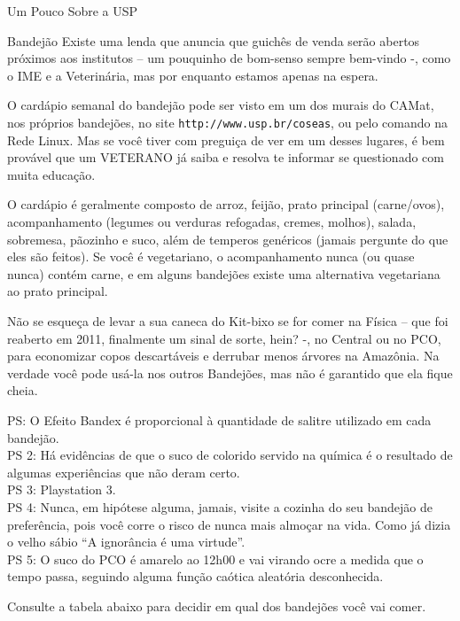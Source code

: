 \begin{secao}{Um Pouco Sobre a USP}
\begin{subsecao}{Bandejão}
Existe uma lenda que anuncia que guichês de venda serão abertos próximos aos
institutos – um pouquinho de bom-senso sempre bem-vindo -, como o IME e
a Veterinária, mas por enquanto estamos apenas na espera.

O cardápio semanal do bandejão pode ser visto em um dos murais do CAMat, nos
próprios bandejões, no site {\tt http://www.usp.br/coseas}, ou pelo
comando  na Rede Linux. Mas se você tiver
com preguiça de ver em um desses lugares, é bem provável que um VETERANO já saiba
e resolva te informar se questionado com muita educação.

O cardápio é geralmente composto de arroz, feijão, prato principal (carne/ovos),
acompanhamento (legumes ou verduras refogadas, cremes, molhos), salada, sobremesa,
pãozinho e suco, além de temperos genéricos (jamais pergunte do que eles são feitos).
Se você é vegetariano, o acompanhamento nunca (ou quase nunca) contém carne, e
em alguns bandejões existe uma alternativa vegetariana ao prato principal.

Não se esqueça de levar a sua caneca do Kit-bixo se for comer na Física – que
foi reaberto em 2011, finalmente um sinal de sorte, hein? -, no Central ou no PCO,
para economizar copos descartáveis e derrubar menos árvores na Amazônia. Na verdade
você pode usá-la nos outros Bandejões, mas não é garantido que ela fique cheia. 

PS: O Efeito Bandex é proporcional à quantidade de salitre utilizado em cada bandejão.\\
PS 2: Há evidências de que o suco de colorido servido na química é o resultado de algumas
experiências que não deram certo.\\
PS 3: Playstation 3.\\
PS 4: Nunca, em hipótese alguma, jamais, visite a cozinha do seu bandejão de preferência,
pois você corre o risco de nunca mais almoçar na vida. Como já dizia o velho sábio ``A
ignorância é uma virtude''.\\
PS 5: O suco do PCO é amarelo ao 12h00 e vai virando ocre a medida que o tempo passa,
seguindo alguma função caótica aleatória desconhecida.

\pagebreak
Consulte a tabela abaixo para decidir em qual dos bandejões você vai comer.
\pagebreak

\end{subsecao}

\end{secao}
